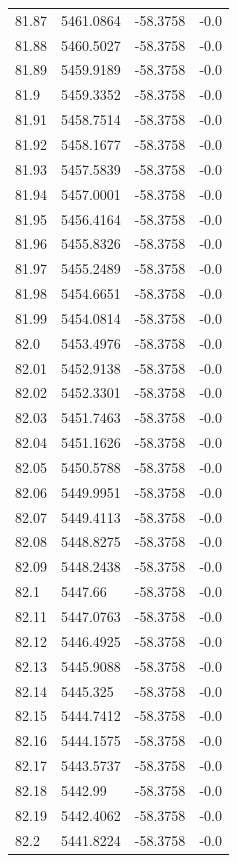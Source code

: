 \begin{table}[H]
\begin{tabular}{llll}
81.87 & 5461.0864 & -58.3758 & -0.0 \\
81.88 & 5460.5027 & -58.3758 & -0.0 \\
81.89 & 5459.9189 & -58.3758 & -0.0 \\
81.9 & 5459.3352 & -58.3758 & -0.0 \\
81.91 & 5458.7514 & -58.3758 & -0.0 \\
81.92 & 5458.1677 & -58.3758 & -0.0 \\
81.93 & 5457.5839 & -58.3758 & -0.0 \\
81.94 & 5457.0001 & -58.3758 & -0.0 \\
81.95 & 5456.4164 & -58.3758 & -0.0 \\
81.96 & 5455.8326 & -58.3758 & -0.0 \\
81.97 & 5455.2489 & -58.3758 & -0.0 \\
81.98 & 5454.6651 & -58.3758 & -0.0 \\
81.99 & 5454.0814 & -58.3758 & -0.0 \\
82.0 & 5453.4976 & -58.3758 & -0.0 \\
82.01 & 5452.9138 & -58.3758 & -0.0 \\
82.02 & 5452.3301 & -58.3758 & -0.0 \\
82.03 & 5451.7463 & -58.3758 & -0.0 \\
82.04 & 5451.1626 & -58.3758 & -0.0 \\
82.05 & 5450.5788 & -58.3758 & -0.0 \\
82.06 & 5449.9951 & -58.3758 & -0.0 \\
82.07 & 5449.4113 & -58.3758 & -0.0 \\
82.08 & 5448.8275 & -58.3758 & -0.0 \\
82.09 & 5448.2438 & -58.3758 & -0.0 \\
82.1 & 5447.66 & -58.3758 & -0.0 \\
82.11 & 5447.0763 & -58.3758 & -0.0 \\
82.12 & 5446.4925 & -58.3758 & -0.0 \\
82.13 & 5445.9088 & -58.3758 & -0.0 \\
82.14 & 5445.325 & -58.3758 & -0.0 \\
82.15 & 5444.7412 & -58.3758 & -0.0 \\
82.16 & 5444.1575 & -58.3758 & -0.0 \\
82.17 & 5443.5737 & -58.3758 & -0.0 \\
82.18 & 5442.99 & -58.3758 & -0.0 \\
82.19 & 5442.4062 & -58.3758 & -0.0 \\
82.2 & 5441.8224 & -58.3758 & -0.0 \\

\end{tabular}
\end{table}
